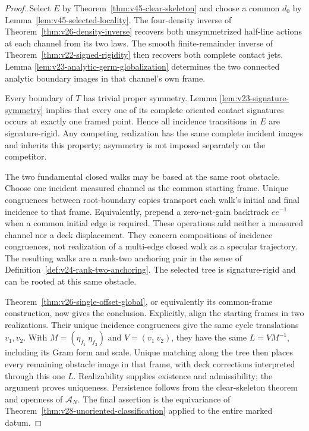\begin{proof}
Select $E$ by Theorem~\ref{thm:v45-clear-skeleton} and choose a common
$d_0$ by Lemma~\ref{lem:v45-selected-locality}.  The four-density inverse
of Theorem~\ref{thm:v26-density-inverse} recovers both unsymmetrized
half-line actions at each channel from its two laws.  The smooth
finite-remainder inverse of Theorem~\ref{thm:v22-signed-rigidity} then
recovers both complete contact jets.  Lemma
\ref{lem:v23-analytic-germ-globalization} determines the two connected
analytic boundary images in that channel's own frame.

Every boundary of $T$ has trivial proper symmetry.  Lemma
\ref{lem:v23-signature-symmetry} implies that every one of its complete
oriented contact signatures occurs at exactly one framed point.  Hence
all incidence transitions in $E$ are signature-rigid.  Any competing
realization has the same complete incident images and inherits this
property; asymmetry is not imposed separately on the competitor.

The two fundamental closed walks may be based at the same root obstacle.
Choose one incident measured channel as the common starting frame.
Unique congruences between root-boundary copies transport each walk's
initial and final incidence to that frame.  Equivalently, prepend a
zero-net-gain backtrack $ee^{-1}$ when a common initial edge is
required.  These operations add neither a measured channel nor a deck
displacement.  They concern compositions of incidence congruences, not
realization of a multi-edge closed walk as a specular trajectory.
The resulting walks are a rank-two anchoring pair in the sense of
Definition~\ref{def:v24-rank-two-anchoring}.  The selected tree is
signature-rigid and can be rooted at this same obstacle.

Theorem~\ref{thm:v26-single-offset-global}, or equivalently its
common-frame construction, now gives the conclusion.  Explicitly, align
the starting frames in two realizations.  Their unique incidence
congruences give the same cycle translations $v_1,v_2$.  With
$M=(\eta_{f_1}\ \eta_{f_2})$ and $V=(v_1\ v_2)$, they have the same
$L=VM^{-1}$, including its Gram form and scale.  Unique matching along
the tree then places every remaining obstacle image in that frame, with
deck corrections interpreted through this one $L$.  Realizability
supplies existence and admissibility; the argument proves uniqueness.
Persistence follows from the clear-skeleton theorem and openness of
$\mathscr A_N$.  The final assertion is the equivariance of
Theorem~\ref{thm:v28-unoriented-classification} applied to the entire
marked datum.
\end{proof}

